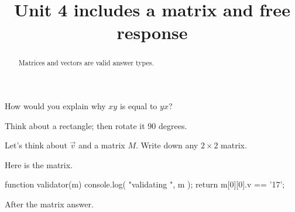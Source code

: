 \PassOptionsToClass{tikzexport}{ximera}\nonstopmode\documentclass{ximera}
\title{Unit 4 includes a matrix and free response}
\begin{document}
\begin{abstract}
  Matrices and vectors are valid answer types.
\end{abstract}

How would you explain why $xy$ is equal to $yx$?
\begin{free-response}
  Think about a rectangle; then rotate it 90 degrees.
\end{free-response}

\begin{exercise}
  Let's think about $\vec{v}$ and a matrix $M$.  Write down any $2
  \times 2$ matrix.

\begin{solution}
  Here is the matrix.

\begin{matrix-answer}[name=M]
  function validator(m) {
    console.log( "validating ", m );
    return m[0][0].v == '17';
  }
\end{matrix-answer}

After the matrix answer.

\end{solution}

\end{exercise}
\end{document}
